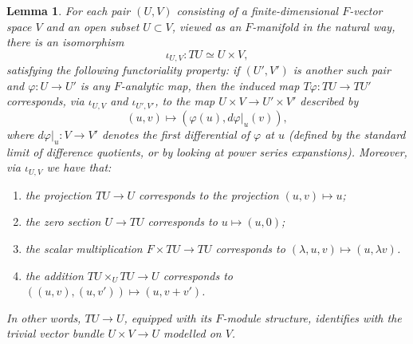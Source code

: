 \documentclass[12pt]{article}
\newtheorem{lemma}[theorem]{Lemma}
\begin{document}
\begin{lemma}\label{localtangent}
For each pair $(U,V)$ consisting of a finite-dimensional $F$-vector space $V$ and an open subset $U\subset V$, viewed as an $F$-manifold in the natural way, there is an isomorphism
$$\iota_{U,V}:TU\simeq U\times V,$$
satisfying the following functoriality property: if $(U',V')$ is another such pair and $\varphi:U\rightarrow U'$ is any $F$-analytic map, then the induced map $T\varphi:TU\rightarrow TU'$ corresponds, via $\iota_{U,V}$ and $\iota_{U',V'}$, to the map $U\times V\rightarrow U'\times V'$ described by
$$(u,v)\mapsto (\varphi(u),d\varphi|_u(v)),$$
where $d\varphi|_u:V\rightarrow V'$ denotes the first differential of $\varphi$ at $u$ (defined by the standard limit of difference quotients, or by looking at power series expanstions).  Moreover, via $\iota_{U,V}$ we have that:
\begin{enumerate}
\item the projection $TU\rightarrow U$ corresponds to the projection $(u,v)\mapsto u$;
\item the zero section $U\rightarrow TU$ corresponds to $u\mapsto (u,0)$;
\item the scalar multiplication $F\times TU\rightarrow TU$ corresponds to $(\lambda,u,v)\mapsto (u,\lambda v)$.
\item the addition $TU\times_U TU\rightarrow U$ corresponds to $((u,v),(u,v'))\mapsto (u,v+v')$.
\end{enumerate}
In other words, $TU\rightarrow U$, equipped with its $F$-module structure, identifies with the trivial vector bundle $U\times V\rightarrow U$ modelled on $V$.
\end{lemma}
\end{document}
